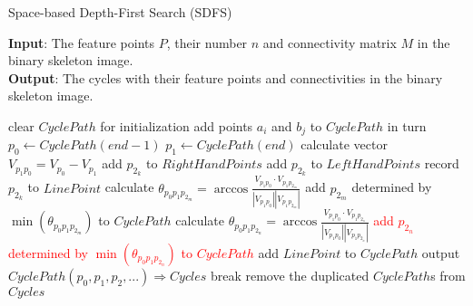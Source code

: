 \documentclass[12pt]{article}
\begin{document}
\begin{algorithm}[!ht]
\caption{Space-based Depth-First Search (SDFS)}\label{alg:sdfs}
\textbf{Input}: The feature points $P$, their number $n$ and connectivity matrix $M$ in the binary skeleton image.\\
\textbf{Output}: The cycles with their feature points and connectivities in the binary skeleton image.
\begin{algorithmic}[1]
\STATE clear $CyclePath$ for initialization
\STATE add points $a_i$ and $b_j$ to $CyclePath$ in turn
\STATE $p_0\leftarrow CyclePath(end-1)$
\STATE $p_1\leftarrow CyclePath(end)$
\STATE calculate vector $V_{p_1p_0}=V_{p_0}-V_{p_1}$
\STATE add $p_{2_k}$ to $RightHandPoints$
\STATE add $p_{2_k}$ to $LeftHandPoints$
\ELSE
\STATE record $p_{2_k}$ to $LinePoint$
\ENDIF
\ENDFOR
{}
\STATE calculate $\theta_{p_0p_1p_{2_m}}=\arccos{\frac{V_{p_1p_0}\cdot V_{p_1p_{2_m}}}{\left|V_{p_1p_0}\right|\left|V_{p_1p_{2_m}}\right|}}$
\ENDFOR
\STATE add $p_{2_m}$ determined by $\min{\left(\theta_{p_0p_1p_{2_m}}\right)}$ to $CyclePath$
\STATE calculate $\theta_{p_0p_1p_{2_n}}=\arccos{\frac{V_{p_1p_0}\cdot V_{p_1p_{2_n}}}{\left|V_{p_1p_0}\right|\left|V_{p_1p_{2_n}}\right|}}$
\ENDFOR
\STATE \textcolor{red}{add $p_{2_n}$ determined by $\min{\left(\theta_{p_0p_1p_{2_n}}\right)}$ to $CyclePath$}
\ELSE
\STATE add $LinePoint$ to $CyclePath$
\ENDIF
{}
\IF {\textcolor{red}{$checkCyclePath(p_0,p_1,p_2,...)$}}
\STATE output $CyclePath(p_0,p_1,p_2,...) \Rightarrow Cycles$
\STATE break
\ENDIF
\ENDIF
\ENDWHILE
\ENDFOR  
\ENDFOR
\STATE remove the duplicated $CyclePath$s from $Cycles$
\end{algorithmic}
\end{algorithm}


\end{document}
